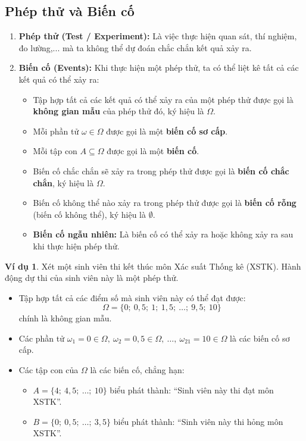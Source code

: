 \documentclass[12pt,a4paper]{article}
\theoremstyle{definition}
\newtheorem{vidu}{Ví dụ}[section]
\begin{document}
\subsection{Phép thử và Biến cố}
\begin{enumerate}[label=\alph*), leftmargin=1.5em]
    \item \textbf{Phép thử (Test / Experiment):} 
    Là việc thực hiện quan sát, thí nghiệm, đo lường,... mà ta không thể dự đoán chắc chắn kết quả xảy ra.
    
    \item \textbf{Biến cố (Events):} 
    Khi thực hiện một phép thử, ta có thể liệt kê tất cả các kết quả có thể xảy ra:
    \begin{itemize}[leftmargin=1.5em]
        \item Tập hợp tất cả các kết quả có thể xảy ra của một phép thử được gọi là \textbf{không gian mẫu} của phép thử đó, ký hiệu là $\Omega$.
        \item Mỗi phần tử $\omega \in \Omega$ được gọi là một \textbf{biến cố sơ cấp}.
        \item Mỗi tập con $A \subseteq \Omega$ được gọi là một \textbf{biến cố}.
        \item Biến cố chắc chắn sẽ xảy ra trong phép thử được gọi là \textbf{biến cố chắc chắn}, ký hiệu là $\Omega$.
        \item Biến cố không thể nào xảy ra trong phép thử được gọi là \textbf{biến cố rỗng} (biến cố không thể), ký hiệu là $\emptyset$.
        \item \textbf{Biến cố ngẫu nhiên:} Là biến cố có thể xảy ra hoặc không xảy ra sau khi thực hiện phép thử.
    \end{itemize}
\end{enumerate}

\begin{vidu}
Xét một sinh viên thi kết thúc môn Xác suất Thống kê (XSTK). Hành động dự thi của sinh viên này là một phép thử.
\begin{itemize}
    \item Tập hợp tất cả các điểm số mà sinh viên này có thể đạt được:
    \[
    \Omega = \{0;\ 0{,}5;\ 1;\ 1{,}5;\ \dots;\ 9{,}5;\ 10\}
    \]
    chính là không gian mẫu.
    \item Các phần tử $\omega_1 = 0 \in \Omega,\ \omega_2 = 0{,}5 \in \Omega,\ \dots,\ \omega_{21} = 10 \in \Omega$ là các biến cố sơ cấp.
    \item Các tập con của $\Omega$ là các biến cố, chẳng hạn:
    \begin{itemize}
        \item $A = \{4;\ 4{,}5;\ \dots;\ 10\}$ biểu phát thành: ``Sinh viên này thi đạt môn XSTK''.
        \item $B = \{0;\ 0{,}5;\ \dots;\ 3{,}5\}$ biểu phát thành: ``Sinh viên này thi hỏng môn XSTK''.
    \end{itemize}
\end{itemize}
\end{vidu}
\end{document}
